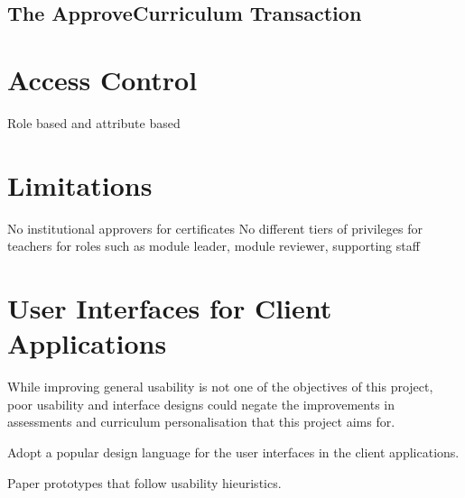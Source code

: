 \subsection{The ApproveCurriculum Transaction}


\section{Access Control}
Role based and attribute based

\section{Limitations}
No institutional approvers for certificates
No different tiers of privileges for teachers for roles such as module leader, module reviewer, supporting staff

\section{User Interfaces for Client Applications}

While improving general usability is not one of the objectives of this project, poor usability and interface designs 
could negate the improvements in assessments and curriculum personalisation that this project aims for.

Adopt a popular design language for the user interfaces in the client applications.

Paper prototypes that follow usability hieuristics.